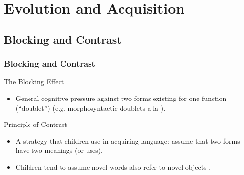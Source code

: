 \documentclass[hyperref={pdfpagelabels=false}]{beamer}
\begin{document}
\section{Evolution and Acquisition}
\subsection{Blocking and Contrast}
\begin{frame}
\frametitle{Blocking and Contrast}
\begin{block}{The Blocking Effect}
	\begin{itemize}
		\item General cognitive pressure against two forms existing for one function (``doublet'') (e.g. morphosyntactic doublets a la \citet{kroch1994}).
	\end{itemize}
\end{block}
\begin{block}{Principle of Contrast}
	\begin{itemize}
		\item A strategy that children use in acquiring language: assume that two forms have two meanings (or uses).\citep[][{ \it inter alia}]{clark1987, clark1990}
		\item Children tend to assume novel words also refer to novel objects \citep{markmanwachtel1988}.
	\end{itemize}
\end{block}
\end{frame}
\end{document}
